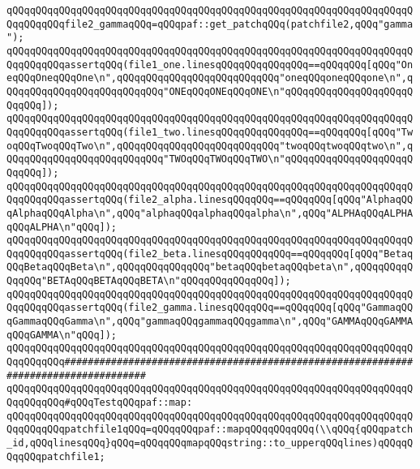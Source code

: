 \verb|qQQqqQQqqQQqqQQqqQQqqQQqqQQqqQQqqQQqqQQqqQQqqQQqqQQqqQQqqQQqqQQqqQQqqQQqqQQqqQQqfile2_gammaqQQq=qQQqpaf::get_patchqQQq(patchfile2,qQQq"gamma");|\newline
\newline
\verb|qQQqqQQqqQQqqQQqqQQqqQQqqQQqqQQqqQQqqQQqqQQqqQQqqQQqqQQqqQQqqQQqqQQqqQQqqQQqqQQqassertqQQq(file1_one.linesqQQqqQQqqQQqqQQq==qQQqqQQq[qQQq"OneqQQqOneqQQqOne\n",qQQqqQQqqQQqqQQqqQQqqQQqqQQq"oneqQQqoneqQQqone\n",qQQqqQQqqQQqqQQqqQQqqQQqqQQq"ONEqQQqONEqQQqONE\n"qQQqqQQqqQQqqQQqqQQqqQQqqQQq]);|\newline
\verb|qQQqqQQqqQQqqQQqqQQqqQQqqQQqqQQqqQQqqQQqqQQqqQQqqQQqqQQqqQQqqQQqqQQqqQQqqQQqqQQqassertqQQq(file1_two.linesqQQqqQQqqQQqqQQq==qQQqqQQq[qQQq"TwoqQQqTwoqQQqTwo\n",qQQqqQQqqQQqqQQqqQQqqQQqqQQq"twoqQQqtwoqQQqtwo\n",qQQqqQQqqQQqqQQqqQQqqQQqqQQq"TWOqQQqTWOqQQqTWO\n"qQQqqQQqqQQqqQQqqQQqqQQqqQQq]);|\newline
\newline
\verb|qQQqqQQqqQQqqQQqqQQqqQQqqQQqqQQqqQQqqQQqqQQqqQQqqQQqqQQqqQQqqQQqqQQqqQQqqQQqqQQqassertqQQq(file2_alpha.linesqQQqqQQq==qQQqqQQq[qQQq"AlphaqQQqAlphaqQQqAlpha\n",qQQq"alphaqQQqalphaqQQqalpha\n",qQQq"ALPHAqQQqALPHAqQQqALPHA\n"qQQq]);|\newline
\verb|qQQqqQQqqQQqqQQqqQQqqQQqqQQqqQQqqQQqqQQqqQQqqQQqqQQqqQQqqQQqqQQqqQQqqQQqqQQqqQQqassertqQQq(file2_beta.linesqQQqqQQqqQQq==qQQqqQQq[qQQq"BetaqQQqBetaqQQqBeta\n",qQQqqQQqqQQqqQQq"betaqQQqbetaqQQqbeta\n",qQQqqQQqqQQqqQQq"BETAqQQqBETAqQQqBETA\n"qQQqqQQqqQQqqQQq]);|\newline
\verb|qQQqqQQqqQQqqQQqqQQqqQQqqQQqqQQqqQQqqQQqqQQqqQQqqQQqqQQqqQQqqQQqqQQqqQQqqQQqqQQqassertqQQq(file2_gamma.linesqQQqqQQq==qQQqqQQq[qQQq"GammaqQQqGammaqQQqGamma\n",qQQq"gammaqQQqgammaqQQqgamma\n",qQQq"GAMMAqQQqGAMMAqQQqGAMMA\n"qQQq]);|\newline
\newline
\newline
\newline
\verb|qQQqqQQqqQQqqQQqqQQqqQQqqQQqqQQqqQQqqQQqqQQqqQQqqQQqqQQqqQQqqQQqqQQqqQQqqQQqqQQq####################################################################################|\newline
\verb|qQQqqQQqqQQqqQQqqQQqqQQqqQQqqQQqqQQqqQQqqQQqqQQqqQQqqQQqqQQqqQQqqQQqqQQqqQQqqQQq#qQQqTestqQQqpaf::map:|\newline
\newline
\verb|qQQqqQQqqQQqqQQqqQQqqQQqqQQqqQQqqQQqqQQqqQQqqQQqqQQqqQQqqQQqqQQqqQQqqQQqqQQqqQQqpatchfile1qQQq=qQQqqQQqpaf::mapqQQqqQQqqQQq(\\qQQq{qQQqpatch_id,qQQqlinesqQQq}qQQq=qQQqqQQqmapqQQqstring::to_upperqQQqlines)qQQqqQQqqQQqpatchfile1;|\newline

